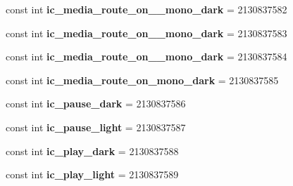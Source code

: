 \begin{DoxyCompactItemize}
\item 
\hypertarget{classClient_1_1Droid_1_1Resource_1_1Drawable_a8142c4b8146dd037b0b14a3e320ca82a}{}const int {\bfseries ic\+\_\+media\+\_\+route\+\_\+on\+\_\+\_\+mono\+\_\+dark} = 2130837582\label{classClient_1_1Droid_1_1Resource_1_1Drawable_a8142c4b8146dd037b0b14a3e320ca82a}

\item 
\hypertarget{classClient_1_1Droid_1_1Resource_1_1Drawable_a11ca03cbaf4341490cd22efea2fcb322}{}const int {\bfseries ic\+\_\+media\+\_\+route\+\_\+on\+\_\+\_\+mono\+\_\+dark} = 2130837583\label{classClient_1_1Droid_1_1Resource_1_1Drawable_a11ca03cbaf4341490cd22efea2fcb322}

\item 
\hypertarget{classClient_1_1Droid_1_1Resource_1_1Drawable_aec7f3019c36e6956673be64d4b327dc7}{}const int {\bfseries ic\+\_\+media\+\_\+route\+\_\+on\+\_\+\_\+mono\+\_\+dark} = 2130837584\label{classClient_1_1Droid_1_1Resource_1_1Drawable_aec7f3019c36e6956673be64d4b327dc7}

\item 
\hypertarget{classClient_1_1Droid_1_1Resource_1_1Drawable_a1a2802fed50c1fc75df39fe957d6b2c8}{}const int {\bfseries ic\+\_\+media\+\_\+route\+\_\+on\+\_\+mono\+\_\+dark} = 2130837585\label{classClient_1_1Droid_1_1Resource_1_1Drawable_a1a2802fed50c1fc75df39fe957d6b2c8}

\item 
\hypertarget{classClient_1_1Droid_1_1Resource_1_1Drawable_a35c11c7e365eb56daa3b978d8cbfa52a}{}const int {\bfseries ic\+\_\+pause\+\_\+dark} = 2130837586\label{classClient_1_1Droid_1_1Resource_1_1Drawable_a35c11c7e365eb56daa3b978d8cbfa52a}

\item 
\hypertarget{classClient_1_1Droid_1_1Resource_1_1Drawable_abc0905393b788e0b8a15e0f5bf118c46}{}const int {\bfseries ic\+\_\+pause\+\_\+light} = 2130837587\label{classClient_1_1Droid_1_1Resource_1_1Drawable_abc0905393b788e0b8a15e0f5bf118c46}

\item 
\hypertarget{classClient_1_1Droid_1_1Resource_1_1Drawable_a1b9e89f25cea65487e4e00d1bd7e7285}{}const int {\bfseries ic\+\_\+play\+\_\+dark} = 2130837588\label{classClient_1_1Droid_1_1Resource_1_1Drawable_a1b9e89f25cea65487e4e00d1bd7e7285}

\item 
\hypertarget{classClient_1_1Droid_1_1Resource_1_1Drawable_a8630ccfe5ba65471695f4e6c480e9155}{}const int {\bfseries ic\+\_\+play\+\_\+light} = 2130837589\label{classClient_1_1Droid_1_1Resource_1_1Drawable_a8630ccfe5ba65471695f4e6c480e9155}


\end{DoxyCompactItemize}
